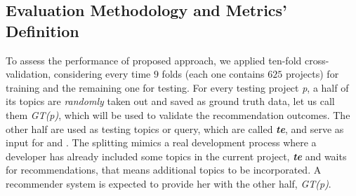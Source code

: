 	\subsection{Evaluation Methodology and Metrics’ Definition}\label{sec:methodology-metric}
To assess the performance of \CR proposed approach, we applied ten-fold cross-validation, considering every time $9$ folds (each one contains $625$ projects) for training and the remaining one for testing. 
	For every testing project \emph{p}, a half of its topics are \emph{randomly} 
	taken out and saved as ground truth data, let us call them \emph{GT(p)}, which will be used to validate the recommendation outcomes. The other half are used 
	as testing topics or query, which are called \emph{\textbf{te}}, and serve 
	as input for  and . %
The splitting mimics a real development process where a 
developer has already included some topics in the current project, \ie 
\emph{\textbf{te}} and waits for recommendations, that means additional topics to be incorporated. A recommender system is expected to provide her 
with the other half, \ie \emph{GT(p)}. %




